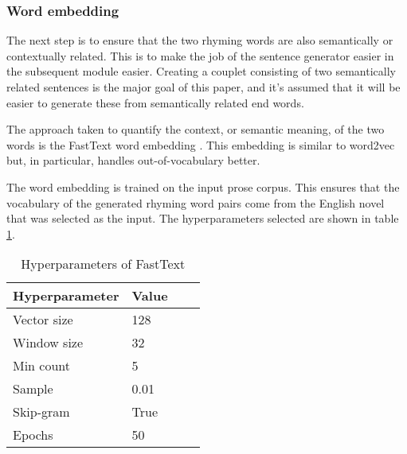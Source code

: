 \documentclass[11pt,a4paper]{article}
\begin{document}
\subsubsection{Word embedding}
\label{sec:fasttext}
The next step is to ensure that the two rhyming words are also semantically or contextually related. This is to make the job of the sentence generator easier in the subsequent module easier. Creating a couplet consisting of two semantically related sentences is the major goal of this paper, and it's assumed that it will be easier to generate these from semantically related end words.

The approach taken to quantify the context, or semantic meaning, of the two words is the FastText word embedding \cite{fasttext}. This embedding is similar to word2vec \cite{wordvec} but, in particular, handles out-of-vocabulary better.

The word embedding is trained on the input prose corpus. This ensures that the vocabulary of the generated rhyming word pairs come from the English novel that was selected as the input. The hyperparameters selected are shown in table \ref{table:HP_fasttext}.

\begin{table}[ht]
\centering
\begin{tabular}{ll c c}
	\hline\hline
	Hyperparameter & Value \\ [0.5ex]
	\hline
	Vector size & 128 \\ [0.5ex]
	Window size & 32 \\ [0.5ex]
	Min count & 5 \\ [0.5ex]
	Sample & 0.01\\ [0.5ex]
	Skip-gram & True\\ [0.5ex]
	Epochs  & 50\\ [0.5ex]
	\hline
\end{tabular}
\caption{Hyperparameters of FastText}
\label{table:HP_fasttext}
\end{table}
\end{document}

